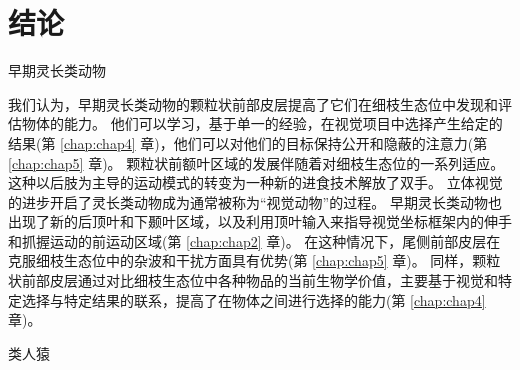 \section{结论}

早期灵长类动物

我们认为，早期灵长类动物的颗粒状前部皮层提高了它们在细枝生态位中发现和评估物体的能力。
他们可以学习，基于单一的经验，在视觉项目中选择产生给定的结果(第 \ref{chap:chap4} 章)，他们可以对他们的目标保持公开和隐蔽的注意力(第 \ref{chap:chap5} 章)。
颗粒状前额叶区域的发展伴随着对细枝生态位的一系列适应。
这种以后肢为主导的运动模式的转变为一种新的进食技术解放了双手。
立体视觉的进步开启了灵长类动物成为通常被称为“视觉动物”的过程。
早期灵长类动物也出现了新的后顶叶和下颞叶区域，以及利用顶叶输入来指导视觉坐标框架内的伸手和抓握运动的前运动区域(第 \ref{chap:chap2} 章)。
在这种情况下，尾侧前部皮层在克服细枝生态位中的杂波和干扰方面具有优势(第 \ref{chap:chap5} 章)。
同样，颗粒状前部皮层通过对比细枝生态位中各种物品的当前生物学价值，主要基于视觉和特定选择与特定结果的联系，提高了在物体之间进行选择的能力(第 \ref{chap:chap4} 章)。


类人猿


